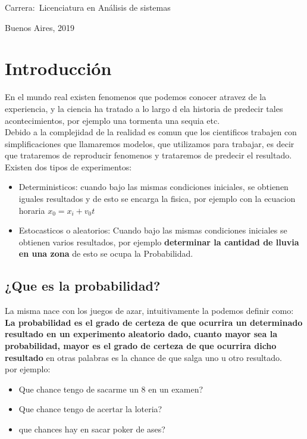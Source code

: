 \documentclass[12pt]{book}
\begin{document}
\noindent Carrera:\,	Licenciatura en An\'alisis de sistemas

\vspace{1cm}

\vspace{1cm}

\noindent Buenos Aires, 2019

\newpage


\tableofcontents

\tableofcontents
\chapter{Introducción}
En el mundo real existen fenomenos que podemos conocer atravez de la experiencia, y la ciencia ha tratado a lo largo d ela historia de predecir tales acontecimientos, por ejemplo una tormenta una sequia etc. 
\\
Debido a la complejidad de la realidad es comun que los cientificos trabajen con simplificaciones que llamaremos modelos, que utilizamos para trabajar, es decir que trataremos de reproducir fenomenos y trataremos de predecir el resultado.
\\
Existen dos tipos de experimentos:
\begin{itemize}
\item Deterministicos: cuando bajo las mismas condiciones iniciales, se obtienen iguales resultados y de esto se encarga la fisica, por ejemplo con la ecuacion horaria $x_0 = x_i + v_0 t$

\item Estocasticos o aleatorios: Cuando bajo las mismas condiciones iniciales se obtienen varios resultados, por ejemplo \textbf{determinar la cantidad de lluvia en una zona} de esto se ocupa la Probabilidad.
\end{itemize}
\section{¿Que es la probabilidad?}
La misma nace con los juegos de azar, intuitivamente la podemos definir como:
\textbf{La probabilidad es el grado de certeza de que ocurrira un determinado resultado en un experimento aleatorio dado, cuanto mayor sea la probabilidad, mayor es el grado de certeza de que ocurrira dicho resultado} en otras palabras es la chance de que salga uno u otro resultado.
\\
por ejemplo:
\begin{itemize}
\item Que chance tengo de sacarme un 8 en un examen?
\item Que chance tengo de acertar la loteria?
\item que chances hay en sacar poker de ases?
\end{itemize}
\end{document}
